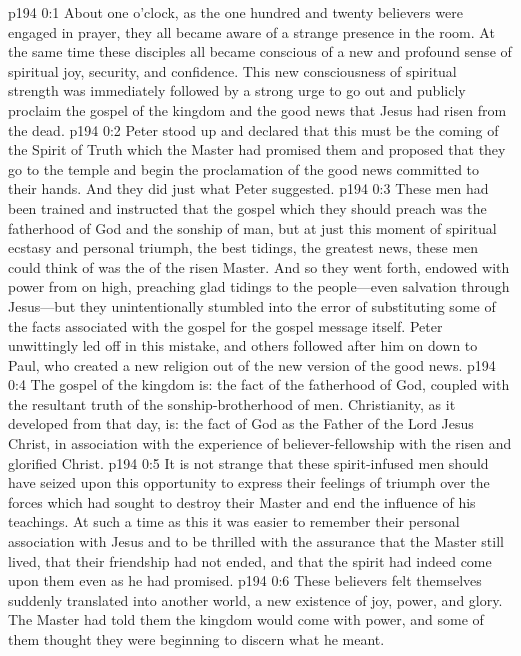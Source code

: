 \author{Midwayer Commission}
\vs p194 0:1 About one o’clock, as the one hundred and twenty believers were engaged in prayer, they all became aware of a strange presence in the room. At the same time these disciples all became conscious of a new and profound sense of spiritual joy, security, and confidence. This new consciousness of spiritual strength was immediately followed by a strong urge to go out and publicly proclaim the gospel of the kingdom and the good news that Jesus had risen from the dead.
\vs p194 0:2 Peter stood up and declared that this must be the coming of the Spirit of Truth which the Master had promised them and proposed that they go to the temple and begin the proclamation of the good news committed to their hands. And they did just what Peter suggested.
\pc \vs p194 0:3 These men had been trained and instructed that the gospel which they should preach was the fatherhood of God and the sonship of man, but at just this moment of spiritual ecstasy and personal triumph, the best tidings, the greatest news, these men could think of was the  of the risen Master. And so they went forth, endowed with power from on high, preaching glad tidings to the people---even salvation through Jesus---but they unintentionally stumbled into the error of substituting some of the facts associated with the gospel for the gospel message itself. Peter unwittingly led off in this mistake, and others followed after him on down to Paul, who created a new religion out of the new version of the good news.
\vs p194 0:4 The gospel of the kingdom is: the fact of the fatherhood of God, coupled with the resultant truth of the sonship\hyp{}brotherhood of men. Christianity, as it developed from that day, is: the fact of God as the Father of the Lord Jesus Christ, in association with the experience of believer\hyp{}fellowship with the risen and glorified Christ.
\vs p194 0:5 It is not strange that these spirit\hyp{}infused men should have seized upon this opportunity to express their feelings of triumph over the forces which had sought to destroy their Master and end the influence of his teachings. At such a time as this it was easier to remember their personal association with Jesus and to be thrilled with the assurance that the Master still lived, that their friendship had not ended, and that the spirit had indeed come upon them even as he had promised.
\vs p194 0:6 These believers felt themselves suddenly translated into another world, a new existence of joy, power, and glory. The Master had told them the kingdom would come with power, and some of them thought they were beginning to discern what he meant.\plusone
